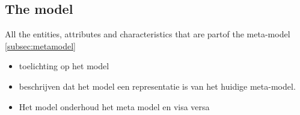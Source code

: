 \subsection{The model} \label{subsec:artifact_model}

All the entities, attributes and characteristics that are partof the meta-model \ref{subsec:metamodel}


\begin{itemize}
    \item toelichting op het model
    \item beschrijven dat het model een representatie is van het
    huidige meta-model.
    \item Het model onderhoud het meta model en visa versa
\end{itemize}